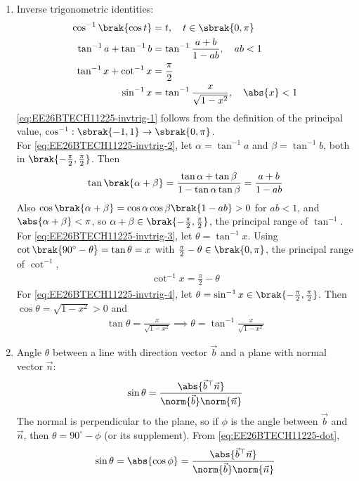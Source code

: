 \begin{enumerate}[label=\thesubsection.\arabic*, ref=\thesubsection.\theenumi]
\item Inverse trigonometric identities:
\begin{align}
	\cos^{-1}\brak{\cos t} &= t, \quad t \in \sbrak{0, \pi}
	\label{eq:EE26BTECH11225-invtrig-1}
	\\
	\tan^{-1}a + \tan^{-1}b &= \tan^{-1}\frac{a + b}{1 - ab}, \quad ab < 1
	\label{eq:EE26BTECH11225-invtrig-2}
	\\
	\tan^{-1}x + \cot^{-1}x &= \frac{\pi}{2}
	\label{eq:EE26BTECH11225-invtrig-3}
	\\
	\sin^{-1}x &= \tan^{-1}\frac{x}{\sqrt{1 - x^2}}, \quad \abs{x} < 1
	\label{eq:EE26BTECH11225-invtrig-4}
\end{align}
\solution
\eqref{eq:EE26BTECH11225-invtrig-1} follows from the definition of the principal value, $\cos^{-1}:\sbrak{-1,1} \to \sbrak{0,\pi}$.
\\
For \eqref{eq:EE26BTECH11225-invtrig-2}, let $\alpha = \tan^{-1}a$ and $\beta = \tan^{-1}b$, both in $\brak{-\frac{\pi}{2}, \frac{\pi}{2}}$. Then
\begin{align}
	\tan\brak{\alpha + \beta} = \frac{\tan\alpha + \tan\beta}{1 - \tan\alpha\tan\beta} = \frac{a + b}{1 - ab}
\end{align}
Also $\cos\brak{\alpha + \beta} = \cos\alpha\cos\beta\brak{1 - ab} > 0$ for $ab < 1$, and $\abs{\alpha + \beta} < \pi$, so $\alpha + \beta \in \brak{-\frac{\pi}{2}, \frac{\pi}{2}}$, the principal range of $\tan^{-1}$.
\\
For \eqref{eq:EE26BTECH11225-invtrig-3}, let $\theta = \tan^{-1}x$. Using $\cot\brak{90^\circ - \theta} = \tan\theta = x$ with $\frac{\pi}{2} - \theta \in \brak{0, \pi}$, the principal range of $\cot^{-1}$,
\begin{align}
	\cot^{-1}x = \frac{\pi}{2} - \theta
\end{align}
For \eqref{eq:EE26BTECH11225-invtrig-4}, let $\theta = \sin^{-1}x \in \brak{-\frac{\pi}{2}, \frac{\pi}{2}}$. Then $\cos\theta = \sqrt{1 - x^2} > 0$ and
\begin{align}
	\tan\theta = \frac{x}{\sqrt{1 - x^2}}
	\implies \theta = \tan^{-1}\frac{x}{\sqrt{1 - x^2}}
\end{align}

\item Angle $\theta$ between a line with direction vector $\vec{b}$ and a plane with normal vector $\vec{n}$:
\begin{align}
	\sin\theta = \frac{\abs{\vec{b}^{\top}\vec{n}}}{\norm{\vec{b}}\norm{\vec{n}}}
	\label{eq:EE26BTECH11225-lineplane}
\end{align}
\solution
The normal is perpendicular to the plane, so if $\phi$ is the angle between $\vec{b}$ and $\vec{n}$, then $\theta = 90^\circ - \phi$ (or its supplement). From \eqref{eq:EE26BTECH11225-dot},
\begin{align}
	\sin\theta = \abs{\cos\phi} = \frac{\abs{\vec{b}^{\top}\vec{n}}}{\norm{\vec{b}}\norm{\vec{n}}}
\end{align}


\end{enumerate}
